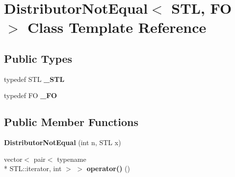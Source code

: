 \hypertarget{class_distributor_not_equal}{\section{Distributor\-Not\-Equal$<$ S\-T\-L, F\-O $>$ Class Template Reference}
\label{class_distributor_not_equal}
}
\subsection*{Public Types}
\begin{DoxyCompactItemize}
\item 
\hypertarget{class_distributor_not_equal_a77aeb302823ee6d7454b99a8c86714c8}{typedef S\-T\-L {\bfseries \-\_\-\-S\-T\-L}}\label{class_distributor_not_equal_a77aeb302823ee6d7454b99a8c86714c8}

\item 
\hypertarget{class_distributor_not_equal_a2ae63b2fe0d95db13b075c129ef3e363}{typedef F\-O {\bfseries \-\_\-\-F\-O}}\label{class_distributor_not_equal_a2ae63b2fe0d95db13b075c129ef3e363}

\end{DoxyCompactItemize}
\subsection*{Public Member Functions}
\begin{DoxyCompactItemize}
\item 
\hypertarget{class_distributor_not_equal_a650620f34f9e762999f3b6a1a854af7f}{{\bfseries Distributor\-Not\-Equal} (int n, S\-T\-L x)}\label{class_distributor_not_equal_a650620f34f9e762999f3b6a1a854af7f}

\item 
\hypertarget{class_distributor_not_equal_aba3690d4319e46ad5ca33f11012141d0}{vector$<$ pair$<$ typename \\*
S\-T\-L\-::iterator, int $>$ $>$ {\bfseries operator()} ()}\label{class_distributor_not_equal_aba3690d4319e46ad5ca33f11012141d0}

\end{DoxyCompactItemize}
